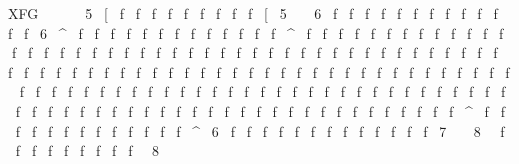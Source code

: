 XFG                        5[fffffffff[56fffffffffffff6^fffffffffffff^fffffffffffffffffffffffffffffffffffffffffffffffffffffffffffffffffffffffffffffffffffffffffffffffffffffffffffffffffffffffffffffffffffffff^fffffffffffff^6fffffffffffff78\fffffffff\8
